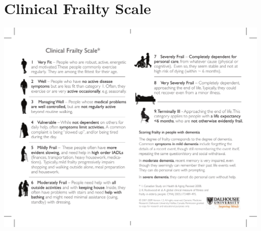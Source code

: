 \documentclass
[
	12pt,
	a4paper,
	oneside,
]{report}
\begin{document}
\printbibliography[heading=bibintoc]

\clearpage

\appendix

\chapter{Clinical Frailty Scale}
\label{apx:cfs}
\includegraphics[width=\textwidth]{CFS}
\end{document}
